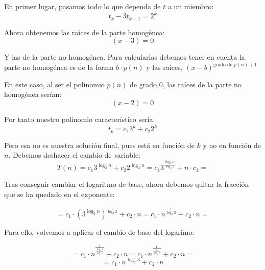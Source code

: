 \documentclass[10pt,a4paper,spanish]{report}
\begin{document}
\begin{center}
En primer lugar, pasamos todo lo que dependa de $t$ a un miembro:
\begin{displaymath}
t_k - 3t_{k-1} = 2^k
\end{displaymath}

Ahora obtenemos las raíces de la parte homogénea:
\begin{displaymath}
(x-3)=0
\end{displaymath}

Y las de la parte no homogénea. Para calcularlas debemos tener en cuenta la parte no homogénea es de la forma $b \cdot p(n)$ y las raíces, $(x-b)^{\textrm{grado de }p(n)+1}$

En este caso, al ser el polinomio $p(n)$ de grado $0$, las raíces de la parte no homogénea serían:
\begin{displaymath}
  (x-2)=0
\end{displaymath}

Por tanto nuestro polinomio característico sería:
\begin{displaymath}
t_k = c_1 3^k + c_2 2^k
\end{displaymath}

Pero esa no es nuestra solución final, pues está en función de $k$ y no en función de $n$. Debemos deshacer el cambio de variable:
\begin{displaymath}
T(n) = c_1 3^{\log_2 n} + c_2 2^{\log_2 n} = c_1 3^{\frac{\log_3 n}{\log_3 2}} + n \cdot c_2 =
\end{displaymath}

Tras conseguir cambiar el logaritmo de base, ahora debemos quitar la fracción que se ha quedado en el exponente:

\begin{displaymath}
= c_1 \cdot (3^{\log_3 n})^{\frac{1}{\log_3 2}} + c_2 \cdot n = c_1 \cdot n^{\frac{1}{\log_3 2}} + c_2 \cdot n = 
\end{displaymath}

Para  ello, volvemos a aplicar el cambio de base del logarimo:

\begin{displaymath}
= c_1 \cdot n^{\frac{1}{\frac{\log_2 2}{\log_2 3}}} + c_2 \cdot n = c_1 \cdot n^{\frac{1}{\frac{1}{\log_2 3}}} + c_2 \cdot n =
\end{displaymath}
\begin{displaymath}
= c_1 \cdot n^{\log_2 3} + c_2 \cdot n
\end{displaymath}
\end{center}
\end{document}
